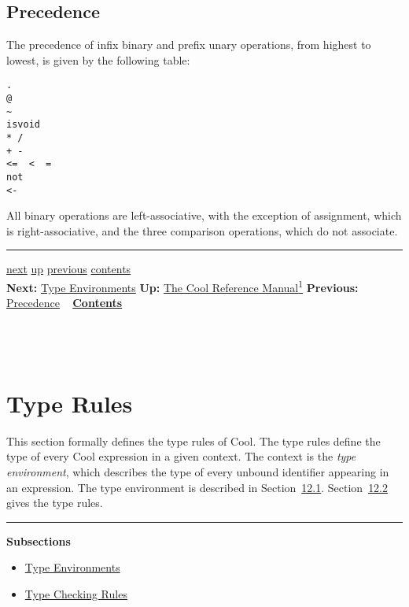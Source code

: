 \documentclass[]{article}
\begin{document}
\subsection{Precedence}

The precedence of infix binary and prefix unary operations, from highest
to lowest, is given by the following table:

\begin{verbatim}
.
@
~
isvoid
* /
+ -
<=  <  =
not
<-
\end{verbatim}

All binary operations are left-associative, with the exception of
assignment, which is right-associative, and the three comparison
operations, which do not associate.

\begin{center}\rule{3in}{0.4pt}\end{center}

\href{node42.html}{next} \href{cool-manual.html}{up}
\href{node40.html}{previous} \href{node1.html}{contents} \\
\textbf{Next:} \href{node42.html}{Type Environments} \textbf{Up:}
\href{cool-manual.html}{The Cool Reference Manual\textsuperscript{1}}
\textbf{Previous:} \href{node40.html}{Precedence} ~
\textbf{\href{node1.html}{Contents}} \\ \\

\section{\\ Type Rules}

This section formally defines the type rules of Cool. The type rules
define the type of every Cool expression in a given context. The context
is the \emph{type environment}, which describes the type of every
unbound identifier appearing in an expression. The type environment is
described in Section~\href{node42.html\#sec-typenv}{12.1}.
Section~\href{node43.html\#sec-typr}{12.2} gives the type rules.

\begin{center}\rule{3in}{0.4pt}\end{center}

\textbf{Subsections}

\begin{itemize}
\itemsep1pt\parskip0pt
\item
  \href{node42.html}{Type Environments}
\item
  \href{node43.html}{Type Checking Rules}
\end{itemize}
\end{document}
